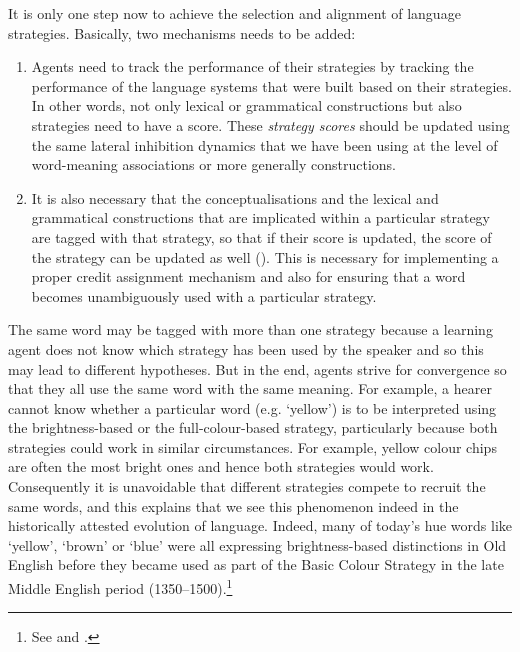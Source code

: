 It is only one step now to achieve the selection and alignment of language strategies. Basically, two mechanisms needs to be 
added: 
\begin{enumerate}
\item Agents need to track the performance of their strategies by tracking the performance of the language 
systems that were built based on their strategies. In other words, not only lexical or grammatical constructions
but also strategies need to have a score. These {\itshape strategy scores} should be updated using the same 
lateral inhibition dynamics that we have been using at the level of word-meaning associations or 
more generally constructions. 
\item It is also necessary that the conceptualisations and the lexical and grammatical constructions that 
are implicated within a particular strategy are tagged with that strategy, so that if their score is updated, 
the score of the strategy can be updated as well (). This is necessary  
for implementing a proper credit assignment 
mechanism and also for ensuring that a word becomes unambiguously used with a particular strategy. 
\end{enumerate}
The same word may be tagged with more than one strategy because 
a learning agent does not know which strategy has been used by the speaker and so this may lead to different
hypotheses. But in the end, agents strive for convergence so that they all use the 
same word with the same meaning. For example, a hearer cannot know whether a particular word (e.g. `yellow')
is to be interpreted using  the brightness-based or  the full-colour-based strategy, particularly
because both strategies could work in similar circumstances. For example, yellow colour chips are often the 
most bright ones and hence both strategies would work. Consequently it is unavoidable that different strategies compete
to recruit the same words, and this explains that we see this phenomenon indeed in the historically attested evolution 
of language. Indeed, many of today's hue words like `yellow', `brown' 
or `blue' were all expressing brightness-based distinctions in Old English before they became used as part of the  
Basic Colour Strategy in the late Middle English period (1350--1500).\footnote{See
\cite{MacLaury:1992} and \cite{Casson:1997}.}


